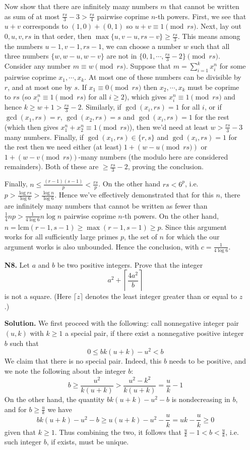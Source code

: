 \documentclass[11pt,a4paper]{article}
\begin{document}
\begin{enumerate}
	Now show that there are infinitely many numbers $m$ that cannot be written as sum of at most $\frac{rs}{3} - 3 > \frac{rs}{4}$ pairwise coprime $n$-th powers. 
	First, we see that $u + v$ corresponds to $(1, 0) + (0, 1)$ so $u + v\equiv 1\pmod{rs}$. 
	Next, lay out $0, u, v, rs$ in that order, then $\max\{u, v - u, rs - v\}\ge \frac{rs}{3}$. 
	This means among the numbers $u - 1, v - 1, rs - 1$, we can choose a number $w$ such that all three numbers 
	$\{w, w - u, w - v\}$ are not in $\{0, 1, \cdots, \frac{rs}{3} - 2\}\pmod{rs}$. 
	Consider any number $m\equiv w\pmod{rs}$. 
	Suppose that $m = \sum_{i=1}^k x_i^n$ for some pairwise coprime $x_1, \cdots, x_k$. 
	At most one of these numbers can be divisible by $r$, 
	and at most one by $s$. 
	If $x_1\equiv 0\pmod{rs}$ then $x_2, \cdots, x_k$ must be coprime to $rs$ (so $x_i^n\equiv 1\pmod{rs}$ for all $i\ge 2$), 
	which gives $x_i^n\equiv 1\pmod{rs}$ 
	and hence $k\ge w + 1 > \frac{rs}{3} - 2$. 
	Similarly, if $\gcd(x_i, rs)=1$ for all $i$, 
	or if $\gcd(x_1, rs)=r$, $\gcd(x_2, rs)=s$ and $\gcd(x_i, rs) = 1$ for the rest (which then gives $x_1^n+x_2^n\equiv 1\pmod{rs}$), 
	then we'd need at least $w > \frac{rs}{3} - 3$ many numbers. 
	Finally, if $\gcd(x_1, rs)\in\{r, s\}$ and $\gcd(x_i, rs) = 1$ for the rest then 
	we need either (at least) $1 + (w - u \pmod{rs})$ or $1 + (w - v \pmod{rs})$-many numbers 
	(the modulo here are considered remainders). 
	Both of these are $\ge \frac{rs}{3} - 2$, proving the conclusion. 
	
	Finally, $n \le \frac{(r-1)(s-1)}{p} < \frac{rs}{p}$. On the other hand $rs < 6^p$, i.e. 
	$p > \frac{\log rs}{\log 6} > \frac{\log n}{\log 6}$. 
	Hence we've effectively demonstrated that for this $n$, 
	there are infinitely many numbers that cannot be written as fewer than $\frac 14 np > \frac {1}{4\log 6}n\log n$ pairwise coprime $n$-th powers. 
	On the other hand, $n=\text{lcm}(r-1, s-1)\ge \max(r-1, s-1)\ge p$. 
	Since this argument works for all sufficiently large primes $p$, 
	the set of $n$ for which the our argument works is also unbounded. 
	Hence the conclusion, with $c = \frac {1}{4\log 6}$. 
	
	\item[\textbf{N8.}] Let $a$ and $b$ be two positive integers. Prove that the integer
	\[a^2+\left\lceil\frac{4a^2}b\right\rceil\]is not a square. (Here $\lceil z\rceil$ denotes the least integer greater than or equal to $z$.)
	
	\textbf{Solution.} 
	We first proceed with the following: 
	call nonnegative integer pair $(u, k)$ with $k\ge 1$ a special pair, if there exist a nonnegative positive integer $b$ such that 
	\[
	0\le bk(u+k) - u^2 < b
	\]
	We claim that there is no special pair. 
	Indeed, this $b$ needs to be positive, and 
	we note the following about the integer $b$: 
	\[
	b\ge \frac{u^2}{k(u + k)} > \frac{u^2-k^2}{k(u + k)} = \frac{u}{k} - 1
	\]
	On the other hand, the quantity $bk(u+k) - u^2 - b$ is nondecreasing in $b$, and for $b\ge \frac{u}{k}$ we have 
	\[
	bk(u+k) - u^2 - b \ge u(u + k) - u^2 - \frac{u}{k} = uk - \frac{u}{k}\ge 0
	\]
	given that $k\ge 1$. 
	Thus combining the two, it follows that $\frac{u}{k}-1 < b < \frac{u}{k}$, i.e. such integer $b$, if exists, must be unique. 
	

\end{enumerate}
\end{document}
